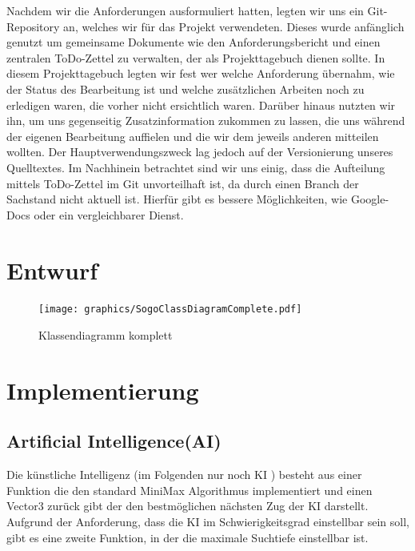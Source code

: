\documentclass[a4paper]{scrartcl}
\begin{document}
Nachdem wir die Anforderungen ausformuliert hatten, legten wir uns ein Git-Repository\cite{GitRepo16} an, welches wir für das Projekt verwendeten. Dieses wurde anfänglich genutzt um gemeinsame Dokumente wie den Anforderungsbericht und einen zentralen ToDo-Zettel zu verwalten, der als Projekttagebuch dienen sollte. In diesem Projekttagebuch legten wir fest wer welche Anforderung übernahm, wie der Status des Bearbeitung ist und welche zusätzlichen Arbeiten noch zu erledigen waren, die vorher nicht ersichtlich waren. Darüber hinaus nutzten wir ihn, um uns gegenseitig Zusatzinformation zukommen zu lassen, die uns während der eigenen Bearbeitung auffielen und die wir dem jeweils anderen mitteilen wollten. Der Hauptverwendungszweck lag jedoch auf der Versionierung unseres Quelltextes. Im Nachhinein betrachtet sind wir uns einig, dass die Aufteilung mittels ToDo-Zettel im Git unvorteilhaft ist, da durch einen Branch der Sachstand nicht aktuell ist. Hierfür gibt es bessere Möglichkeiten, wie Google-Docs oder ein vergleichbarer Dienst.

\section{Entwurf}\label{ch:Entwurf}

\begin{figure}[H]
 \centering
 \texttt{[image: graphics/SogoClassDiagramComplete.pdf]}
 \caption{Klassendiagramm komplett}
 \label{fig:ClassdiagramComplete}
\end{figure}

\section{Implementierung}\label{ch:Implementierung}

\subsection{Artificial Intelligence(AI)}\label{ch:AI}
Die künstliche Intelligenz (im Folgenden nur noch KI ) besteht aus einer Funktion die den standard MiniMax Algorithmus implementiert und einen Vector3 zurück gibt der den bestmöglichen nächsten Zug der KI darstellt. Aufgrund der Anforderung, dass die KI im Schwierigkeitsgrad einstellbar sein soll, gibt es eine zweite Funktion, in der die maximale Suchtiefe einstellbar ist. \cite{Fox03} 
\end{document}
